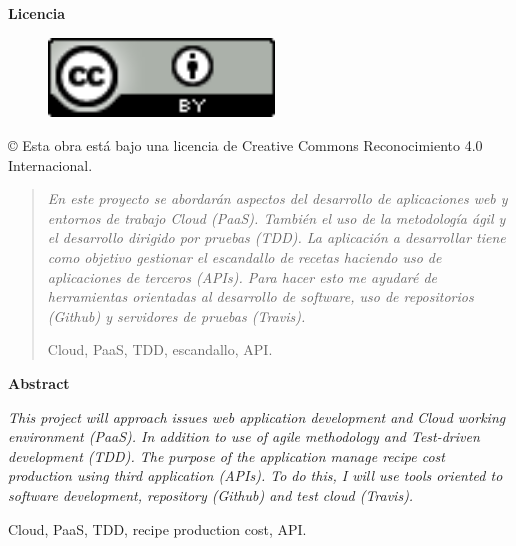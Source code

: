 \documentclass[spanish,a4paper,14pt,twoside]{report}
\newenvironment{summary}
{\par\noindent\begin{center}\textbf{Abstract}\end{center}\begin{itshape}\par\noindent}
{\end{itshape}}
\newenvironment{keywords}
{\begin{list}{}{\setlength{\leftmargin}{1em}}\item[\hskip\labelsep \bfseries Keywords:]}
{\end{list}}
\newenvironment{palabrasClave}
{\begin{list}{}{\setlength{\leftmargin}{1em}}\item[\hskip\labelsep \bfseries Palabras clave:]}
{\end{list}}
\begin{document}
\newpage
{
\begin{center}
  \textbf{{\huge Licencia}}

  \vspace*{0.2in}
  \begin{figure}[htb]
    \begin{center}
      \includegraphics[width=6cm]{./images/logotipo-licencia.png}
    \end{center}
  \end{figure}
  
  \vspace*{0.2in}
  \begin{Large}
    © Esta obra está bajo una licencia de Creative Commons Reconocimiento 4.0 Internacional.
  \end{Large}
\end{center}
}


\newpage
\begin{abstract}
{\em 
En este proyecto se abordarán aspectos del desarrollo de aplicaciones web y entornos de trabajo Cloud (PaaS). También el uso de la metodología ágil y el desarrollo dirigido por pruebas (TDD). La aplicación a desarrollar tiene como objetivo gestionar el escandallo de recetas haciendo uso de aplicaciones de terceros (APIs). Para hacer esto me ayudaré de herramientas orientadas al desarrollo de software, uso de repositorios (Github) y servidores de pruebas (Travis).
}

\vspace*{0.2in}
\begin{palabrasClave}
  Cloud, PaaS, TDD, escandallo, API.
\end{palabrasClave}

\end{abstract}

\newpage
\begin{summary}
{\em 
This project will approach issues web application development and Cloud working environment (PaaS). In addition to use of agile methodology and Test-driven development (TDD). The purpose of the application manage recipe cost production using third application (APIs). To do this, I will use tools oriented to software development, repository (Github) and test cloud (Travis).
}

\vspace*{0.2in}
\begin{keywords}
  Cloud, PaaS, TDD, recipe production cost, API.
\end{keywords}

\end{summary}
\end{document}
